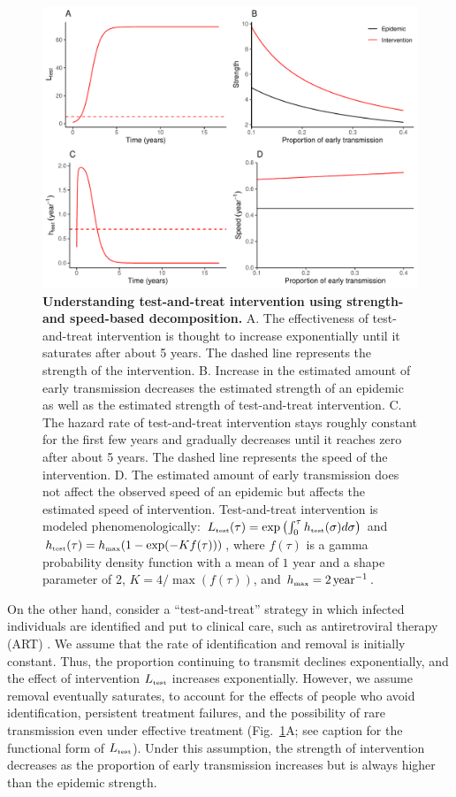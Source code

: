 \documentclass[12pt]{article}
\newcommand{\tsub}[2]{#1_{{\textrm{\tiny #2}}}}
\newcommand{\figref}[1]{Fig.~\ref{fig:#1}}
\newcommand{\figlab}[1]{\label{fig:#1}}
\begin{document}
\begin{figure}[!t]
\includegraphics[width=\textwidth]{../figure/test_and_treat.pdf}
\caption{
\textbf{Understanding test-and-treat intervention using strength- and speed-based decomposition.}
A. The effectiveness of test-and-treat intervention is thought to increase exponentially until it saturates after about 5 years.
The dashed line represents the strength of the intervention.
B. Increase in the estimated amount of early transmission decreases the estimated strength of an epidemic as well as the estimated strength of test-and-treat intervention.
C. The hazard rate of test-and-treat intervention stays roughly constant for the first few years and gradually decreases until it reaches zero after about 5 years.
The dashed line represents the speed of the intervention.
D. The estimated amount of early transmission does not affect the observed speed of an epidemic but affects the estimated speed of intervention.
Test-and-treat intervention is modeled phenomenologically: $\tsub{L}{test}(\tau) = \exp\left(\int_0^\tau \tsub{h}{test}(\sigma) d\sigma \right)$ and $\tsub{h}{test}(\tau) = \tsub{h}{max} (1 - \exp(- K f(\tau)))$, where $f(\tau)$ is a gamma probability density function with a mean of $1$ year and a shape parameter of 2, $K = 4/\max(f(\tau))$, and $\tsub{h}{max} = 2\,\mathrm{year}^{-1}$.
}
\figlab{test}
\end{figure}

On the other hand, consider a ``test-and-treat'' strategy in which infected individuals are identified and put to clinical care, such as antiretroviral therapy (ART) \citep{garnett2009treating, nah2017test}.
We assume that the rate of identification and removal is initially constant.
Thus, the proportion continuing to transmit declines exponentially, and the effect of intervention $\tsub{L}{test}$ increases exponentially.
However, we assume removal eventually saturates, to account for the effects of people who avoid identification, persistent treatment failures, and the possibility of rare transmission even under effective treatment
(\figref{test}A; see caption for the functional form of $\tsub{L}{test}$).
Under this assumption, the strength of intervention decreases as the proportion of early transmission increases but is always higher than the epidemic strength.
\end{document}
